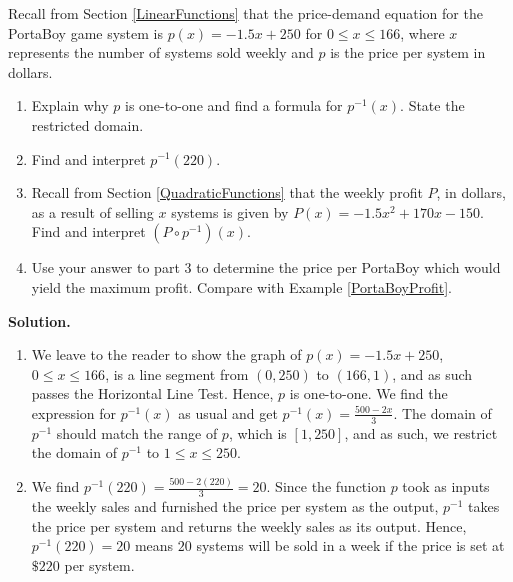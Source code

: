 \begin{ex} \label{demandfunctionofprice} Recall from Section \ref{LinearFunctions} that the price-demand equation for the PortaBoy game system is $p(x) = -1.5x + 250$ for $0 \leq x \leq 166$, where $x$ represents the number of systems sold weekly and $p$ is the price per system in dollars.   

\begin{enumerate}

\pagebreak

\item  Explain why $p$ is one-to-one and find a formula for $p^{-1}(x)$.  State the restricted domain.

\item  Find and interpret $p^{-1}(220)$.

\item  Recall from Section \ref{QuadraticFunctions} that the weekly profit $P$, in dollars, as a result of selling $x$ systems is given by $P(x)= -1.5x^2+170x-150$.  Find and interpret $\left( P \circ p^{-1}\right)(x)$.  

\item  Use your answer to part 3 to determine the price per PortaBoy which would yield the maximum profit.  Compare with Example \ref{PortaBoyProfit}.

\end{enumerate}

{\bf Solution.}

\begin{enumerate}

\item  We leave to the reader to show the graph of $p(x) = -1.5x + 250$, $0 \leq x \leq 166$, is a line segment from $(0,250)$ to $(166,1)$, and as such passes the Horizontal Line Test.  Hence, $p$ is one-to-one.  We find the expression for $p^{-1}(x)$ as usual and get $p^{-1}(x) =  \frac{500-2x}{3}$.  The domain of $p^{-1}$ should match the range of $p$, which is $[1,250]$, and as such, we restrict the domain of $p^{-1}$ to $1 \leq x \leq 250$.  

\item  We find $p^{-1}(220) = \frac{500-2(220)}{3} = 20$.  Since the function $p$ took as inputs the weekly sales  and furnished the price per system as the output, $p^{-1}$ takes the price per system and returns the weekly sales as its output.  Hence, $p^{-1}(220) = 20$ means $20$ systems will be sold in a week if the price is set at $\$ 220$ per system.


\end{enumerate}
\end{ex}
